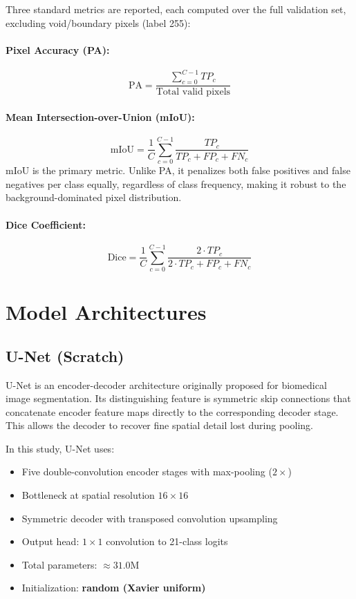 \documentclass[11pt,a4paper]{article}
\begin{document}
Three standard metrics are reported, each computed over the full validation set, excluding void/boundary pixels (label 255):

\paragraph{Pixel Accuracy (PA):}
\begin{equation}
\text{PA} = \frac{\sum_{c=0}^{C-1} TP_c}{\text{Total valid pixels}}
\end{equation}

\paragraph{Mean Intersection-over-Union (mIoU):}
\begin{equation}
\text{mIoU} = \frac{1}{C} \sum_{c=0}^{C-1} \frac{TP_c}{TP_c + FP_c + FN_c}
\end{equation}
mIoU is the primary metric. Unlike PA, it penalizes both false positives and false negatives per class equally, regardless of class frequency, making it robust to the background-dominated pixel distribution.

\paragraph{Dice Coefficient:}
\begin{equation}
\text{Dice} = \frac{1}{C} \sum_{c=0}^{C-1} \frac{2 \cdot TP_c}{2 \cdot TP_c + FP_c + FN_c}
\end{equation}

\section{Model Architectures}

\subsection{U-Net (Scratch)}

U-Net is an encoder-decoder architecture originally proposed for biomedical image segmentation. Its distinguishing feature is symmetric skip connections that concatenate encoder feature maps directly to the corresponding decoder stage. This allows the decoder to recover fine spatial detail lost during pooling.

In this study, U-Net uses:
\begin{itemize}
  \item Five double-convolution encoder stages with max-pooling ($2\times$)
  \item Bottleneck at spatial resolution $16 \times 16$
  \item Symmetric decoder with transposed convolution upsampling
  \item Output head: $1 \times 1$ convolution to 21-class logits
  \item Total parameters: $\approx 31.0$M
  \item Initialization: \textbf{random (Xavier uniform)}
\end{itemize}
\end{document}
